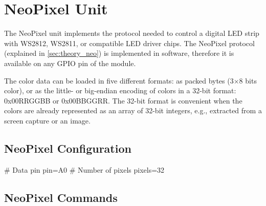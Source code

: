 \section{NeoPixel Unit}

The NeoPixel unit implements the protocol needed to control a digital \gls{LED} strip with WS2812, WS2811, or compatible \gls{LED} driver chips. The NeoPixel protocol (explained in \cref{sec:theory_neo}) is implemented in software, therefore it is available on any \gls{GPIO} pin of the module.

The color data can be loaded in five different formats: as packed bytes (3$\times$8 bits color), or as the little- or big-endian encoding of colors in a 32-bit format: 0x00RRGGBB or 0x00BBGGRR. The 32-bit format is convenient when the colors are already represented as an array of 32-bit integers, e.g., extracted from a screen capture or an image.

\subsection{NeoPixel Configuration}

\begin{inicode}
# Data pin
pin=A0
# Number of pixels
pixels=32
\end{inicode}

\subsection{NeoPixel Commands}

